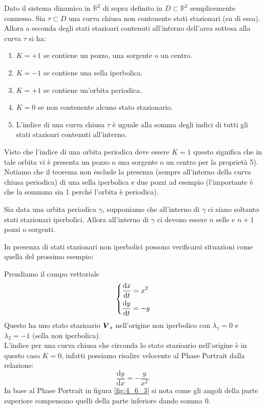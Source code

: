 \begin{thm}
    Dato il sistema dinamico in $\mathbb{R}^2$ di sopra definito in $D\subset \mathbb{R}^2$ semplicemente connesso. Sia $\tau\subset D$ una curva chiusa non contenente stati stazionari (su di essa).
    Allora a seconda degli stati stazioari contenuti all'interno dell'area sottesa alla curva $\tau$ si ha:
    \begin{enumerate}
        \item $K=+1$ se contiene un pozzo, una sorgente o un centro.
	\item $K=-1$ se contiene una sella iperbolica.
	\item $K = +1$ se contiene un'orbita periodica.
	\item $K = 0$ se non contenente alcuno stato stazionario.
	\item L'indice di una curva chiusa $\tau$ è uguale alla somma degli indici di tutti gli stati stazioari contenuti all'interno.
    \end{enumerate}
\end{thm}
\noindent
\begin{exmp}
    Visto che l'indice di una orbita periodica deve essere $K=1$ questo significa che in tale orbita vi è presenta un pozzo o una sorgente o un centro per la proprietà 5).\\
    Notiamo che il teorema non esclude la presenza (sempre all'interno della curva chiusa periodica) di una sella iperbolica e due pozzi ad esempio (l'importante è che la sommma sia 1 perché l'orbita è periodica).
\end{exmp}
\noindent
\begin{cor}
    Sia data una orbita periodica $\gamma$, supponiamo che all'interno di $\gamma$ ci siano soltanto stati stazionari iperbolici. Allora all'interno di $\gamma$ ci devono essere $n$ selle e $n+1$ pozzi o sorgenti.
\end{cor}
\noindent
In presenza di stati stazionari non iperbolici possono verificarsi situazioni come quella del prossimo esempio:
\begin{exmp}
    Prendiamo il campo vettoriale
    \[
    \begin{dcases}
    \frac{\text{d} x}{\text{d} t} = x^2\\
    \frac{\text{d} y}{\text{d} t} = - y
    \end{dcases}
    \]
    Questo ha uno stato stazioario $\boldsymbol{V}_s$ nell'origine non iperbolico con $\lambda_1 = 0$ e $\lambda_2=-1$ (sella non iperbolica). \\
    L'indice per una curva chiusa che circonda lo stato stazioario nell'origine è in questo caso $K = 0$, infatti possiamo risalire velocente al Phase Portrait dalla relazione:
    \[
        \frac{\text{d} y}{\text{d} x} = -\frac{y}{x ^2}
    .\] 
    In base al Phase Portrait in figura \ref{fig:4_6_3} si nota come gli angoli della parte superiore compensano quelli della parte inferiore dando somma 0.
\end{exmp}
